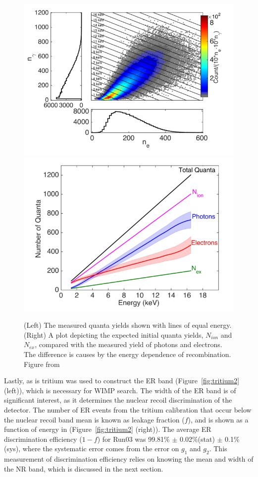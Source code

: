 \begin{figure}[htbp]
\begin{center}
\includegraphics[width=\halffig]{figures/lux/lux_tritium3a.png}
\includegraphics[width=\halffig]{figures/lux/lux_tritium3b.png}
\caption{ (Left) The measured quanta yields shown with lines of equal energy. (Right) A plot depicting the expected initial quanta yields, $N_{ion}$ and $N_{ex}$, compared with the measured yield of photons and electrons. The difference is causes by the energy dependence of recombination. Figure from \cite{LUXTritium}}
\label{fig:tritium3}
\end{center}
\end{figure}

Lastly, as is tritium was used to construct the \ac{ER} band (Figure~\ref{fig:tritium2} (left)), which is necessary for \ac{WIMP} search. The width of the \ac{ER} band is of significant interest, as it determines the nuclear recoil discrimination of the detector. The number of \ac{ER} events from the tritium calibration that occur below the nuclear recoil band mean is known as leakage fraction ($f$), and is shown as a function of energy in (Figure~\ref{fig:tritium2} (right)). The average \ac{ER} discrimination efficiency ($1-f$) for Run03 was 99.81\% $\pm$ 0.02\%(stat) $\pm$ 0.1\%(sys), where the systematic error comes from the error on $g_{1}$ and $g_{2}$. This measurement of discrimination efficiency relies on knowing the mean and width of the \ac{NR} band, which is discussed in the next section.

